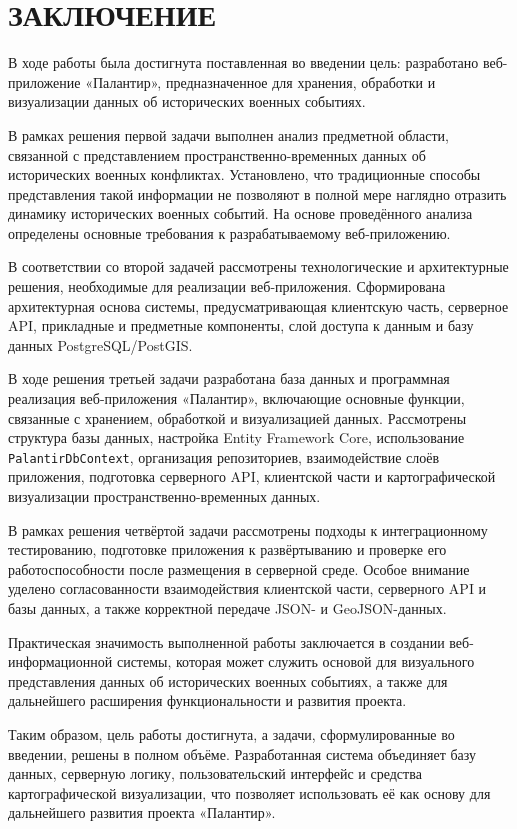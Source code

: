 \chapter*{ЗАКЛЮЧЕНИЕ}

В ходе работы была достигнута поставленная во введении цель: разработано веб-приложение «Палантир», предназначенное для хранения, обработки и визуализации данных об исторических военных событиях.

В рамках решения первой задачи выполнен анализ предметной области, связанной с представлением пространственно-временных данных об исторических военных конфликтах. Установлено, что традиционные способы представления такой информации не позволяют в полной мере наглядно отразить динамику исторических военных событий. На основе проведённого анализа определены основные требования к разрабатываемому веб-приложению.

В соответствии со второй задачей рассмотрены технологические и архитектурные решения, необходимые для реализации веб-приложения. Сформирована архитектурная основа системы, предусматривающая клиентскую часть, серверное API, прикладные и предметные компоненты, слой доступа к данным и базу данных PostgreSQL/PostGIS.

В ходе решения третьей задачи разработана база данных и программная реализация веб-приложения «Палантир», включающие основные функции, связанные с хранением, обработкой и визуализацией данных. Рассмотрены структура базы данных, настройка Entity Framework Core, использование \texttt{PalantirDbContext}, организация репозиториев, взаимодействие слоёв приложения, подготовка серверного API, клиентской части и картографической визуализации пространственно-временных данных.

В рамках решения четвёртой задачи рассмотрены подходы к интеграционному тестированию, подготовке приложения к развёртыванию и проверке его работоспособности после размещения в серверной среде. Особое внимание уделено согласованности взаимодействия клиентской части, серверного API и базы данных, а также корректной передаче JSON- и GeoJSON-данных.

Практическая значимость выполненной работы заключается в создании веб-информационной системы, которая может служить основой для визуального представления данных об исторических военных событиях, а также для дальнейшего расширения функциональности и развития проекта.

Таким образом, цель работы достигнута, а задачи, сформулированные во введении, решены в полном объёме. Разработанная система объединяет базу данных, серверную логику, пользовательский интерфейс и средства картографической визуализации, что позволяет использовать её как основу для дальнейшего развития проекта «Палантир».